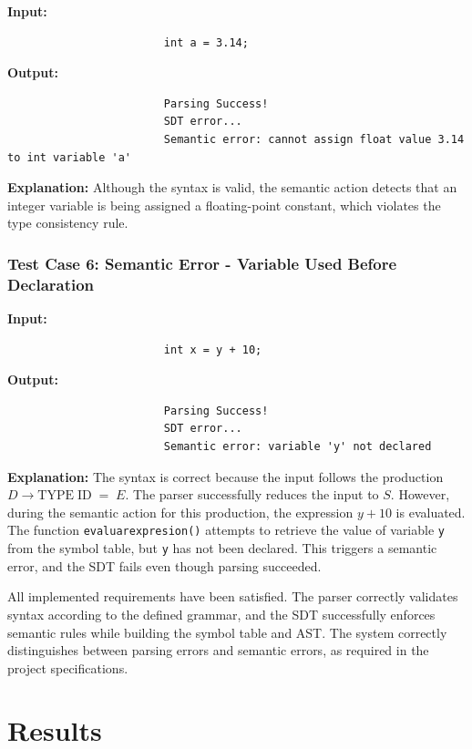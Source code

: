 \documentclass[letterpaper,12pt,oneside]{article}
\begin{document}
\textbf{Input:}
\begin{verbatim}
						int a = 3.14;
\end{verbatim}

\noindent\textbf{Output:}
\begin{verbatim}
						Parsing Success!
						SDT error...
						Semantic error: cannot assign float value 3.14 to int variable 'a'
\end{verbatim}

\textbf{Explanation:} Although the syntax is valid, the semantic action detects that an integer variable is being assigned a floating-point constant, which violates the type consistency rule.

\subsubsection{Test Case 6: Semantic Error - Variable Used Before Declaration}

\textbf{Input:}
\begin{verbatim}
						int x = y + 10;
\end{verbatim}

\noindent\textbf{Output:}
\begin{verbatim}
						Parsing Success!
						SDT error...
						Semantic error: variable 'y' not declared
\end{verbatim}

\textbf{Explanation:} The syntax is correct because the input follows the production $D \rightarrow \text{TYPE} \; \text{ID} \; = \; E$. The parser successfully reduces the input to $S$. However, during the semantic action for this production, the expression $y + 10$ is evaluated. The function \texttt{evaluarexpresion()} attempts to retrieve the value of variable \texttt{y} from the symbol table, but \texttt{y} has not been declared. This triggers a semantic error, and the SDT fails even though parsing succeeded.

\vspace{10pt}

All implemented requirements have been satisfied. The parser correctly validates syntax according to the defined grammar, and the SDT successfully enforces semantic rules while building the symbol table and AST. The system correctly distinguishes between parsing errors and semantic errors, as required in the project specifications.

\section{Results}
\end{document}
